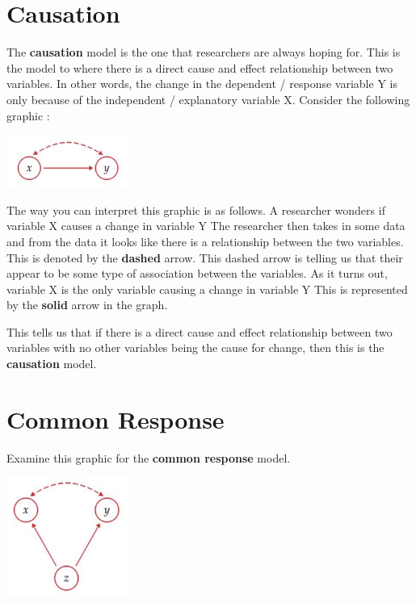 \documentclass[
  letterpaper,
  DIV=11,
  numbers=noendperiod]{scrreprt}
\begin{document}
\section*{Causation}\label{causation}


The \textbf{causation} model is the one that researchers are always
hoping for. This is the model to where there is a direct cause and
effect relationship between two variables. In other words, the change in
the dependent / response variable Y is only because of the independent /
explanatory variable X. Consider the following graphic :

\includegraphics[width=0.3\textwidth,height=\textheight]{./images/IDV_1.jpg}

The way you can interpret this graphic is as follows. A researcher
wonders if variable X causes a change in variable Y The researcher then
takes in some data and from the data it looks like there is a
relationship between the two variables. This is denoted by the
\textbf{dashed} arrow. This dashed arrow is telling us that their appear
to be some type of association between the variables. As it turns out,
variable X is the only variable causing a change in variable Y This is
represented by the \textbf{solid} arrow in the graph.

This tells us that if there is a direct cause and effect relationship
between two variables with no other variables being the cause for
change, then this is the \textbf{causation} model.

\section*{Common Response}\label{common-response}


Examine this graphic for the \textbf{common response} model.

\includegraphics[width=0.3\textwidth,height=\textheight]{./images/IDV_2.jpg}
\end{document}
